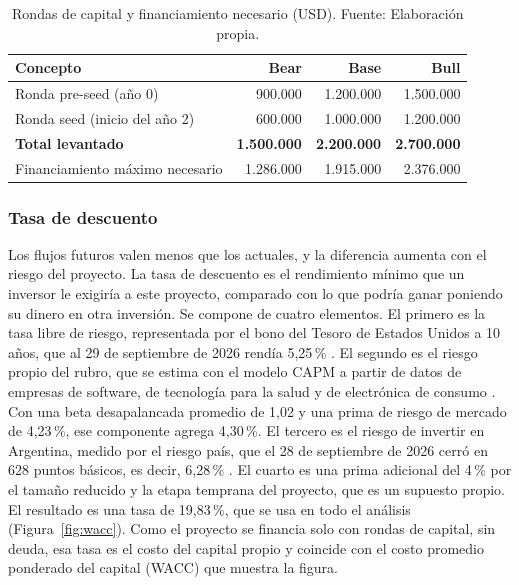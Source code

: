 \begin{table}[H]
\centering
\caption[Rondas de capital y financiamiento necesario.]{Rondas de capital y financiamiento necesario (USD). Fuente: Elaboración propia.}
\label{tab:rondas}
\begin{tabular}{|p{6.2cm}|r|r|r|}
\hline
\textbf{Concepto} & \textbf{Bear} & \textbf{Base} & \textbf{Bull} \\
\hline
Ronda pre-seed (año 0) & 900.000 & 1.200.000 & 1.500.000 \\
\hline
Ronda seed (inicio del año 2) & 600.000 & 1.000.000 & 1.200.000 \\
\hline
\textbf{Total levantado} & \textbf{1.500.000} & \textbf{2.200.000} & \textbf{2.700.000} \\
\hline
Financiamiento máximo necesario & 1.286.000 & 1.915.000 & 2.376.000 \\
\hline
\end{tabular}
\end{table}

\subsubsection{Tasa de descuento}
\label{sec:wacc}

Los flujos futuros valen menos que los actuales, y la diferencia aumenta con el riesgo del proyecto.
La tasa de descuento es el rendimiento mínimo que un inversor le exigiría a este proyecto, comparado con lo que podría ganar poniendo su dinero en otra inversión.
Se compone de cuatro elementos.
El primero es la tasa libre de riesgo, representada por el bono del Tesoro de Estados Unidos a 10 años, que al 29 de septiembre de 2026 rendía 5,25\,\% \parencite{Treasury2026}.
El segundo es el riesgo propio del rubro, que se estima con el modelo CAPM \parencite{Sharpe1964} a partir de datos de empresas de software, de tecnología para la salud y de electrónica de consumo \parencite{Damodaran2026}.
Con una beta desapalancada promedio de 1,02 y una prima de riesgo de mercado de 4,23\,\%, ese componente agrega 4,30\,\%.
El tercero es el riesgo de invertir en Argentina, medido por el riesgo país, que el 28 de septiembre de 2026 cerró en 628 puntos básicos, es decir, 6,28\,\% \parencite{Infobae2026}.
El cuarto es una prima adicional del 4\,\% por el tamaño reducido y la etapa temprana del proyecto, que es un supuesto propio.
El resultado es una tasa de 19,83\,\%, que se usa en todo el análisis (Figura~\ref{fig:wacc}).
Como el proyecto se financia solo con rondas de capital, sin deuda, esa tasa es el costo del capital propio y coincide con el costo promedio ponderado del capital (WACC) que muestra la figura.


